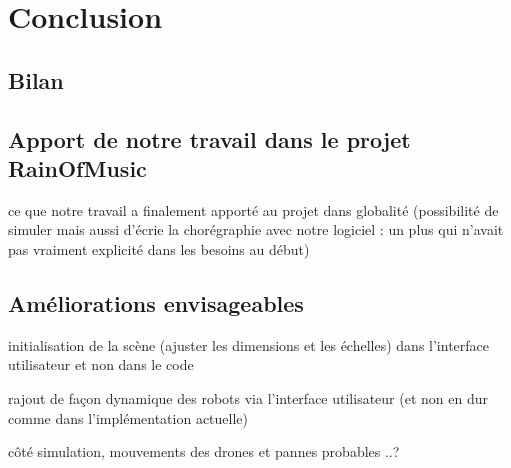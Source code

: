 \section{Conclusion}
\subsection{Bilan}


\subsection{Apport de notre travail dans le projet RainOfMusic}
ce que notre travail a finalement apporté au projet dans globalité (possibilité de simuler mais aussi d'écrie la chorégraphie avec notre logiciel : un plus qui n'avait pas vraiment explicité dans les besoins au début)

\subsection{Améliorations envisageables}
initialisation de la scène (ajuster les dimensions et les échelles) dans l'interface utilisateur et non dans le code 

rajout de façon dynamique des robots via l'interface utilisateur (et non en dur comme dans l'implémentation actuelle)

côté simulation, mouvements des drones et pannes probables ..?


